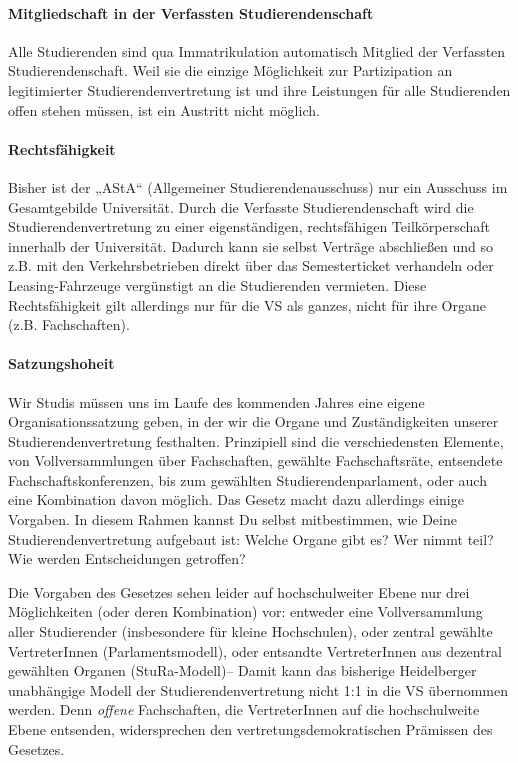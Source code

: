 \paragraph{Mitgliedschaft in der Verfassten Studierendenschaft}

Alle Studierenden sind qua Immatrikulation automatisch Mitglied der Verfassten Studierendenschaft. Weil sie die einzige Möglichkeit zur Partizipation an legitimierter Studierendenvertretung ist und ihre Leistungen für alle Studierenden offen stehen müssen, ist ein Austritt nicht möglich.

\paragraph{Rechtsfähigkeit}

Bisher ist der „AStA“ (Allgemeiner Studierendenausschuss) nur ein Ausschuss im Gesamtgebilde Universität. Durch die Verfasste Studierendenschaft wird die Studierendenvertretung zu einer eigenständigen, rechtsfähigen Teilkörperschaft innerhalb der Universität. Dadurch kann sie selbst Verträge abschließen und so z.B. mit den Verkehrsbetrieben direkt über das Semesterticket verhandeln oder Leasing-Fahrzeuge vergünstigt an die Studierenden vermieten. Diese Rechtsfähigkeit gilt allerdings nur für die VS als ganzes, nicht für ihre Organe (z.B. Fachschaften).

\paragraph{Satzungshoheit}

Wir Studis müssen uns im Laufe des kommenden Jahres eine eigene Organisationssatzung geben, in der wir die Organe und Zuständigkeiten unserer Studierendenvertretung festhalten. Prinzipiell sind die verschiedensten Elemente, von Vollversammlungen über Fachschaften, gewählte Fachschaftsräte, entsendete Fachschaftskonferenzen, bis zum gewählten Studierendenparlament, oder auch eine Kombination davon möglich. Das Gesetz macht dazu allerdings einige Vorgaben. In diesem Rahmen kannst Du selbst mitbestimmen, wie Deine Studierendenvertretung aufgebaut ist: Welche Organe gibt es? Wer nimmt teil? Wie werden Entscheidungen getroffen?

Die Vorgaben des Gesetzes sehen leider auf hochschulweiter Ebene nur drei Möglichkeiten (oder deren Kombination) vor: entweder eine Vollversammlung aller Studierender (insbesondere für kleine Hochschulen), oder zentral gewählte VertreterInnen (Parlamentsmodell), oder entsandte VertreterInnen aus dezentral gewählten Organen (StuRa-Modell)-- Damit kann das bisherige Heidelberger unabhängige Modell der Studierendenvertretung nicht 1:1 in die VS übernommen werden. Denn \emph{offene} Fachschaften, die VertreterInnen auf die hochschulweite Ebene entsenden, widersprechen den vertretungsdemokratischen Prämissen des Gesetzes.

